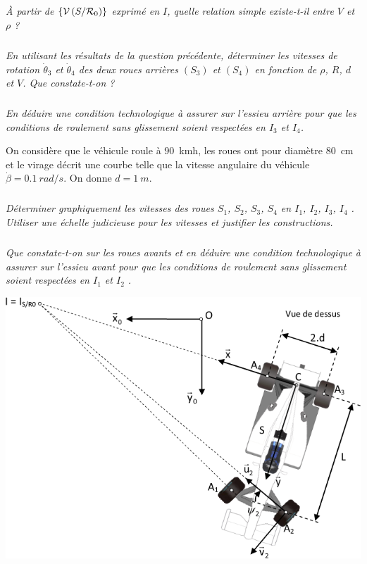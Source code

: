 \documentclass[10pt,fleqn]{article} %
\begin{document}
\begin{multicols}{2}
\subparagraph{}
\textit{À partir de $\left\{\mathcal{V} \left(S/\mathcal{R}_{0} \right) \right\}$ exprimé en $I$, quelle relation simple existe-t-il entre $V$ et $\rho$ ?}
\ifprof%
\begin{corrige}
\end{corrige}\else\fi
\subparagraph{}
\textit{En utilisant les résultats de la question précédente, déterminer les vitesses de rotation $\dot{\theta}_3$ et $\dot{\theta}_4$ des deux roues arrières $(S_3)$ et $(S_4)$ en fonction de $\rho$, $R$, $d$ et $V$. Que constate-t-on ? }
\ifprof%
\begin{corrige}
\end{corrige}\else\fi
\subparagraph{}
\textit{En déduire une condition technologique à assurer sur l'essieu arrière pour que les conditions de roulement sans glissement soient respectées en $I_3$ et $I_4$. }
\ifprof%
\begin{corrige}
\end{corrige}\else\fi

On considère que le véhicule roule à \SI{90}{km}{h}, les roues ont pour diamètre \SI{80}{cm} et le virage décrit une courbe telle que la vitesse angulaire du véhicule  $\dot{\beta}=\SI{0,1}{rad/s}$. On donne $d=\SI{1}{m}$. 

\subparagraph{}
\textit{Déterminer graphiquement les vitesses des roues $S_1$, $S_2$, $S_3$, $S_4$ en $I_1$, $I_2$, $I_3$, $I_4$ . Utiliser une échelle judicieuse pour les vitesses et  justifier les constructions.}
\ifprof%
\begin{corrige}
\end{corrige}\else\fi
\subparagraph{}
\textit{Que constate-t-on sur les roues avants et en déduire une condition technologique à assurer sur l'essieu avant pour que les conditions de roulement sans glissement soient respectées en $I_1$ et $I_2$ . }
\ifprof%
\begin{corrige}
\end{corrige}\else\fi





\ifprof
\else
\end{multicols}
\fi

\begin{center}
\includegraphics[width=\linewidth]{images/fig_03}
\end{center}
\end{document}
